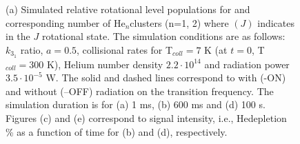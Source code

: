 \begin{figure}[!htb]
\begin{adjustbox}{minipage=\linewidth,scale=0.9}
    \hfill
    \hfill
    
    \end{adjustbox}
    
    \caption{
        (a) Simulated relative rotational level populations for
        \CD and corresponding number of He$_n$\CD clusters (n=1, 2) 
        where \CD$(J)$ indicates \CD in the $J$ rotational state. 
        The simulation conditions are as follows: $k_{3_1}$ ratio, $a=0.5$, 
        collisional rates for T$_{coll}=7$ K  (at $t=0$, T$_{coll}=300$ K), 
        Helium number density $2.2 \cdot 10^{14}$ \percc and radiation power $3.5\cdot10^{-5}$ W. 
        The solid and dashed lines correspond to with (-ON) and without (--OFF) 
        radiation on the \CD \CDline transition frequency. 
        The simulation duration is for (a) 1 ms, (b) 600 ms and (d) 100 s. 
        Figures (c) and (e) correspond to signal intensity, i.e., He\CD depletion \% as a 
        function of time for (b) and (d), respectively.
    }
    
    \label{fig:thz-sim:rel-pop}

\end{figure}
